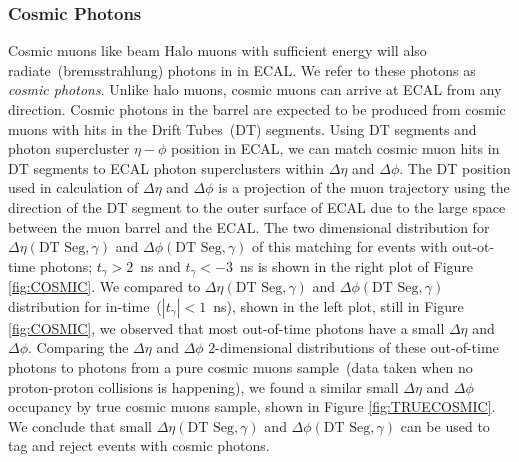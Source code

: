 \subsubsection{Cosmic Photons}
Cosmic muons like beam Halo muons with sufficient energy  will also radiate~(bremsstrahlung) photons in in ECAL. We refer to these photons as \textit{cosmic photons}. Unlike halo muons, cosmic muons can arrive at ECAL from any direction. Cosmic photons in the barrel are expected to be produced from cosmic muons with hits in the Drift Tubes~(DT) segments. Using DT segments and  photon supercluster $\eta-\phi$ position in ECAL, we can match cosmic muon hits in DT segments to ECAL photon superclusters within $\Delta\eta$ and $\Delta\phi$. The DT position used in calculation of $\Delta\eta$ and $\Delta\phi$ is a projection of the muon trajectory using the direction of the DT segment to the outer surface of ECAL due to the large space between the muon barrel and the ECAL. The two dimensional distribution for $\Delta\eta(\mbox{DT Seg},\gamma)$ and $\Delta\phi(\mbox{DT Seg},\gamma)$ of this matching for events with out-ot-time photons; $t_{\gamma} > 2$~ns and $t_{\gamma} < -3$~ns is shown in the right plot of Figure \ref{fig:COSMIC}. We compared to $\Delta\eta(\mbox{DT Seg},\gamma)$ and $\Delta\phi(\mbox{DT Seg},\gamma)$ distribution for in-time~($|t_{\gamma}| < 1$~ns), shown in the left plot, still in Figure \ref{fig:COSMIC}, we observed that most out-of-time photons have a small $\Delta\eta$ and $\Delta\phi$. Comparing the $\Delta\eta$  and $\Delta\phi$ 2-dimensional distributions of these out-of-time photons to photons from a pure cosmic muons sample~(data taken when no proton-proton collisions is happening), we found a similar small $\Delta\eta$ and $\Delta\phi$ occupancy by true cosmic muons sample, shown in Figure \ref{fig:TRUECOSMIC}. We conclude that small $\Delta\eta(\mbox{DT Seg},\gamma)$  and $\Delta\phi(\mbox{DT Seg},\gamma)$ can be used to tag and reject events with cosmic photons.

